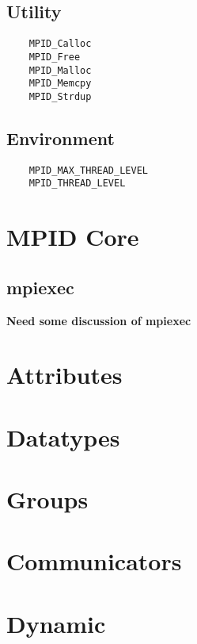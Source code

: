 \documentclass{article}
\begin{document}
\subsection{Utility}
\begin{verbatim}
    MPID_Calloc
    MPID_Free
    MPID_Malloc
    MPID_Memcpy
    MPID_Strdup
\end{verbatim}

\subsection{Environment}
\begin{verbatim}
    MPID_MAX_THREAD_LEVEL
    MPID_THREAD_LEVEL
\end{verbatim}

\section{MPID Core}



\subsection{mpiexec}
\textbf{Need some discussion of mpiexec}

\section{Attributes}





\section{Datatypes}




\section{Groups}



\section{Communicators}


\section{Dynamic}

\end{document}
